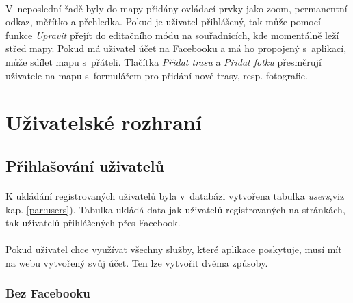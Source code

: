 \documentclass[11pt,a4paper,titlepage,oneside]{book}
\begin{document}

			\paragraph{} V~neposlední řadě byly do mapy přidány ovládací prvky jako zoom, permanentní odkaz, měřítko a přehledka. Pokud je uživatel přihlášený, tak může pomocí funkce \textit{Upravit} přejít do editačního módu na souřadnicích, kde momentálně leží střed mapy. Pokud má uživatel účet na Facebooku a má ho propojený s~aplikací, může sdílet mapu s~přáteli. Tlačítka \textit{Přidat trasu} a \textit{Přidat fotku} přesměrují uživatele na mapu s~formulářem pro přidání nové trasy, resp. fotografie.
			
		\section{Uživatelské rozhraní}
			\subsection{Přihlašování uživatelů}


				\paragraph{}K ukládání registrovaných uživatelů byla v~databázi vytvořena tabulka \textit{users},viz kap. \ref{par:users}). Tabulka ukládá data jak uživatelů registrovaných na stránkách, tak uživatelů přihlášených přes Facebook.
					\paragraph{} Pokud uživatel chce využívat všechny služby, které aplikace poskytuje, musí mít na webu vytvořený svůj účet. Ten lze vytvořit dvěma způsoby.
					\subsubsection{Bez Facebooku} 
\end{document}
